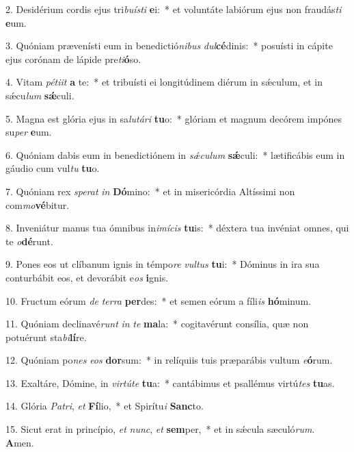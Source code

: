 2. Desidérium cordis ejus tri\textit{bu}\textit{ís}\textit{ti} \textbf{e}i:~*  et voluntáte labiórum ejus non fraudás\textit{ti} \textbf{e}um.\

3. Quóniam prævenísti eum in benedictió\textit{ni}\textit{bus} \textit{dul}\textbf{cé}dinis:~*  posuísti in cápite ejus corónam de lápide pre\textit{ti}\textbf{ó}so.\

4. Vitam \textit{pé}\textit{ti}\textit{it} \textbf{a} te:~*  et tribuísti ei longitúdinem diérum in sǽculum, et in sǽcu\textit{lum} \textbf{sǽ}culi.\

5. Magna est glória ejus in sa\textit{lu}\textit{tá}\textit{ri} \textbf{tu}o:~*  glóriam et magnum decórem impónes su\textit{per} \textbf{e}um.\

6. Quóniam dabis eum in benedictiónem in \textit{sǽ}\textit{cu}\textit{lum} \textbf{sǽ}culi:~*  lætificábis eum in gáudio cum vul\textit{tu} \textbf{tu}o.\

7. Quóniam rex \textit{spe}\textit{rat} \textit{in} \textbf{Dó}mino:~*  et in misericórdia Altíssimi non com\textit{mo}\textbf{vé}bitur.\

8. Inveniátur manus tua ómnibus in\textit{i}\textit{mí}\textit{cis} \textbf{tu}is:~*  déxtera tua invéniat omnes, qui te \textit{o}\textbf{dé}runt.\

9. Pones eos ut clíbanum ignis in témpo\textit{re} \textit{vul}\textit{tus} \textbf{tu}i:~*  Dóminus in ira sua conturbábit eos, et devorábit e\textit{os} \textbf{i}gnis.\

10. Fructum eórum \textit{de} \textit{ter}\textit{ra} \textbf{per}des:~*  et semen eórum a fíli\textit{is} \textbf{hó}minum.\

11. Quóniam declinavé\textit{runt} \textit{in} \textit{te} \textbf{ma}la:~*  cogitavérunt consília, quæ non potuérunt sta\textit{bi}\textbf{lí}re.\

12. Quóniam po\textit{nes} \textit{e}\textit{os} \textbf{dor}sum:~*  in relíquiis tuis præparábis vultum \textit{e}\textbf{ó}rum.\

13. Exaltáre, Dómine, in \textit{vir}\textit{tú}\textit{te} \textbf{tu}a:~*  cantábimus et psallémus virtú\textit{tes} \textbf{tu}as.\

14. Glória \textit{Pa}\textit{tri}, \textit{et} \textbf{Fí}lio,~*  et Spirítu\textit{i} \textbf{Sanc}to.\

15. Sicut erat in princípio, \textit{et} \textit{nunc}, \textit{et} \textbf{sem}per,~*  et in sǽcula sæculó\textit{rum}. \textbf{A}men.\

